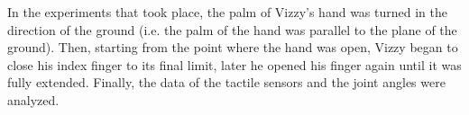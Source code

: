 \par

In the experiments that took place, the palm of Vizzy's hand was turned in the direction of the ground (i.e. the palm of the hand was parallel to the plane of the ground).
Then, starting from the point where the hand was open, Vizzy began to close his index finger to its final limit, later he opened his finger again until it was fully extended.
Finally, the data of the tactile sensors and the joint angles were analyzed.